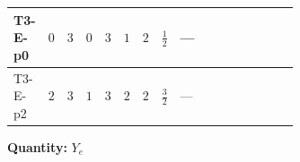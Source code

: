 \documentclass[8pt]{article}
\begin{document}
\begin{landscape}
\begin{longtable}{@{}llcccccc >{\raggedright\arraybackslash}p{0.21\linewidth} >{\raggedright\arraybackslash}p{0.21\linewidth} >{\raggedright\arraybackslash}p{0.21\linewidth}@{}}
\midrule
T3-E-p0 & $0$ & $3$ & $0$ & $3$ & $1$ & $2$ & $\frac{1}{2}$ & --- & \scriptsize\adjustbox{max width=\linewidth}{$\begin{gathered} -\frac{9}{4} {g_2}^2 \left({Y_e}\right)_{ij}\end{gathered}$} & \scriptsize\adjustbox{max width=\linewidth}{$\begin{gathered} -\frac{15}{4} {g_1}^2 \left({Y_e}\right)_{ij}\end{gathered}$} \\
\midrule
T3-E-p2 & $2$ & $3$ & $1$ & $3$ & $2$ & $2$ & $\frac{3}{2}$ & --- & \scriptsize\adjustbox{max width=\linewidth}{$\begin{gathered} -\frac{9}{4} {g_2}^2 \left({Y_e}\right)_{ij}\end{gathered}$} & \scriptsize\adjustbox{max width=\linewidth}{$\begin{gathered} -\frac{15}{4} {g_1}^2 \left({Y_e}\right)_{ij}\end{gathered}$} \\
\midrule
\bottomrule
\end{longtable}
\clearpage
\noindent\textbf{Quantity: }$Y_e$\par\smallskip

\end{landscape}
\end{document}
